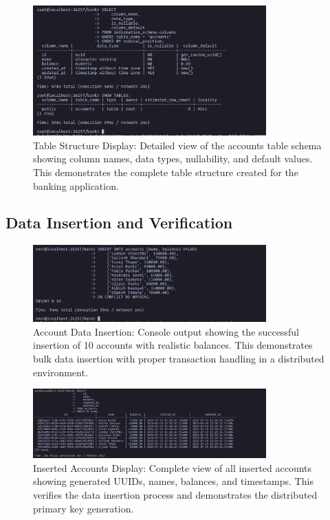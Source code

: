 \begin{figure}[H]
  \centering
  \includegraphics[width=0.8\textwidth]{task-5/screenshots/table-structure.png}
  \caption{Table Structure Display: Detailed view of the accounts table schema showing column names, data types, nullability, and default values. This demonstrates the complete table structure created for the banking application.}
  \label{fig:task5-table-structure}
\end{figure}

\subsection*{Data Insertion and Verification}

\begin{figure}[H]
  \centering
  \includegraphics[width=0.8\textwidth]{task-5/screenshots/insert-balance.png}
  \caption{Account Data Insertion: Console output showing the successful insertion of 10 accounts with realistic balances. This demonstrates bulk data insertion with proper transaction handling in a distributed environment.}
  \label{fig:task5-insert-balance}
\end{figure}

\begin{figure}[H]
  \centering
  \includegraphics[width=0.8\textwidth]{task-5/screenshots/display-inserted-data.png}
  \caption{Inserted Accounts Display: Complete view of all inserted accounts showing generated UUIDs, names, balances, and timestamps. This verifies the data insertion process and demonstrates the distributed primary key generation.}
  \label{fig:task5-display-inserted}
\end{figure}

